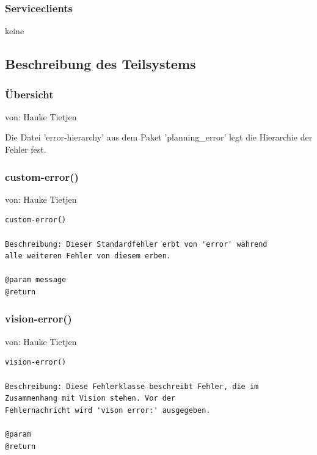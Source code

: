 \documentclass{suturo}
\makeatletter
\newcommand{\chapterauthor}[1]{%
  {\parindent0pt\vspace*{-27pt}%
  \linespread{0}\small\begin{flushright}von: #1\end{flushright}%
  \par\nobreak\vspace*{0pt}}
  \@afterheading%
}
\makeatother
\begin{document}
\subsubsection{Serviceclients}
keine
\subsection{Beschreibung des Teilsystems}
\subsubsection{\"Ubersicht}
\chapterauthor{Hauke Tietjen}
Die Datei 'error-hierarchy' aus dem Paket 'planning\_error' legt die Hierarchie der Fehler fest.

\begin{figure}[!htb]
\end{figure}

\subsubsection{custom-error()}
\chapterauthor{Hauke Tietjen}
\begin{verbatim}
custom-error()

Beschreibung: Dieser Standardfehler erbt von 'error' während
alle weiteren Fehler von diesem erben. 

@param message
@return 
\end{verbatim}

\subsubsection{vision-error()}
\chapterauthor{Hauke Tietjen}
\begin{verbatim}
vision-error()

Beschreibung: Diese Fehlerklasse beschreibt Fehler, die im
Zusammenhang mit Vision stehen. Vor der 
Fehlernachricht wird 'vison error:' ausgegeben. 

@param
@return 
\end{verbatim}
\end{document}
